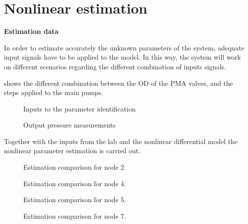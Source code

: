 \chapter{Nonlinear estimation}
\label{NonLinResults}

\textbf{Estimation data}

In order to estimate accurately the unknown parameters of the system, adequate input signals have to be applied to the model. In this way, the system 
will work on different scenarios regarding the different combination of inputs signals. 

 shows the different combination between the OD of the PMA valves, and the steps applied to the main pumps. 


\begin{figure}[H]
  \centering
  \begin{minipage}[b]{0.45\textwidth}
     
    \caption{Inputs to the parameter identification}
  \end{minipage}
  \hfill
  \begin{minipage}[b]{0.45\textwidth}
     
    \caption{Output pressure measurements}
  \end{minipage}
  \label{fig:nonlinearpumps}
\end{figure}



Together with the inputs from the lab and the nonlinear differential model the nonlinear parameter estimation is carried out. 

\begin{figure}[H]
  \centering
  \begin{minipage}[b]{0.45\textwidth}
    
    \caption{Estimation comparison for node 2.}
  \end{minipage}
  \hfill
  \begin{minipage}[b]{0.45\textwidth}
    
    \caption{Estimation comparison for node 4.}
  \end{minipage}
\end{figure}

\begin{figure}[H]
  \centering
  \begin{minipage}[b]{0.45\textwidth}
    
    \caption{Estimation comparison for node 5.}
  \end{minipage}
  \hfill
  \begin{minipage}[b]{0.45\textwidth}
    
    \caption{Estimation comparison for node 7.}
  \end{minipage}
\end{figure}

